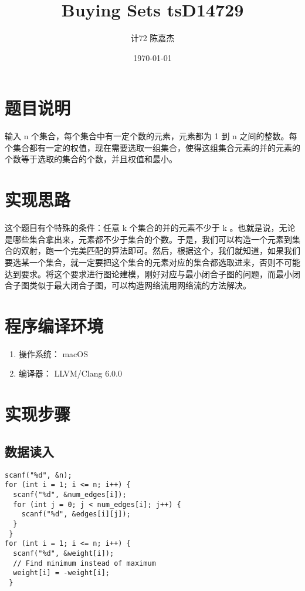 \documentclass[11pt]{article}
\author{计72 陈嘉杰}
\date{\today}
\title{Buying Sets tsD14729}
\begin{document}
\maketitle
\tableofcontents

\section{题目说明}
\label{sec:org15f337c}
输入 n 个集合，每个集合中有一定个数的元素，元素都为 1 到 n 之间的整数。每个集合都有一定的权值，现在需要选取一组集合，使得这组集合元素的并的元素的个数等于选取的集合的个数，并且权值和最小。

\section{实现思路}
\label{sec:org695d3d1}
这个题目有个特殊的条件：任意 k 个集合的并的元素不少于 k 。也就是说，无论是哪些集合拿出来，元素都不少于集合的个数。于是，我们可以构造一个元素到集合的双射，跑一个完美匹配的算法即可。然后，根据这个，我们就知道，如果我们要选某一个集合，就一定要把这个集合的元素对应的集合都选取进来，否则不可能达到要求。将这个要求进行图论建模，刚好对应与最小闭合子图的问题，而最小闭合子图类似于最大闭合子图，可以构造网络流用网络流的方法解决。

\section{程序编译环境}
\label{sec:org048f3c3}
\begin{enumerate}
\item 操作系统： macOS
\item 编译器： LLVM/Clang 6.0.0
\end{enumerate}

\section{实现步骤}
\label{sec:orgf871837}
\subsection{数据读入}
\label{sec:org5a9c357}
\begin{verbatim}
scanf("%d", &n);
for (int i = 1; i <= n; i++) {
  scanf("%d", &num_edges[i]);
  for (int j = 0; j < num_edges[i]; j++) {
    scanf("%d", &edges[i][j]);
  }
 }
for (int i = 1; i <= n; i++) {
  scanf("%d", &weight[i]);
  // Find minimum instead of maximum
  weight[i] = -weight[i];
 }
\end{verbatim}
\end{document}
